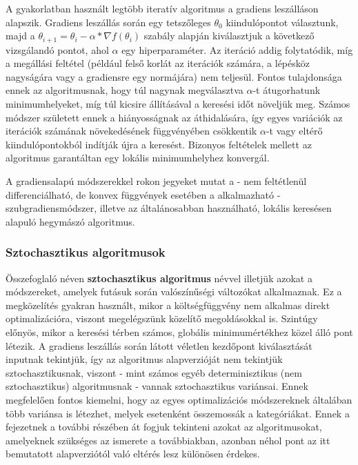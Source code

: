 A gyakorlatban használt legtöbb iteratív algoritmus a gradiens leszálláson alapszik. Gradiens leszállás során egy tetszőleges $\theta_0$ kiindulópontot választunk, majd a $\theta_{i+1} = \theta_i - \alpha * \nabla f(\theta_i)$ szabály alapján kiválasztjuk a következő vizsgálandó pontot, ahol $\alpha$ egy hiperparaméter. Az iteráció addig folytatódik, míg a megállási feltétel (például felső korlát az iterációk számára, a lépésköz nagyságára vagy a gradiensre egy normájára) nem teljesül. Fontos tulajdonsága ennek az algoritmusnak, hogy túl nagynak megválasztva $\alpha$-t átugorhatunk minimumhelyeket, míg túl kicsire állításával a keresési időt növeljük meg. Számos módszer született ennek a hiányosságnak az áthidalására, így egyes variációk az iterációk számának növekedésének függvényében csökkentik $\alpha$-t vagy eltérő kiindulópontokból indítják újra a keresést. Bizonyos feltételek mellett az algoritmus garantáltan egy lokális minimumhelyhez konvergál\cite{gradient_convergence}.


A gradiensalapú módszerekkel rokon jegyeket mutat a - nem feltétlenül differenciálható, de konvex függvények esetében a alkalmazható - szubgradiensmódszer, illetve az általánosabban használható, lokális keresésen alapuló hegymászó algoritmus.

\subsubsection{Sztochasztikus algoritmusok}

Összefoglaló néven \textbf{sztochasztikus algoritmus} névvel illetjük azokat a módszereket, amelyek futásuk során valószínűségi változókat alkalmaznak. Ez a megközelítés gyakran használt, mikor a költségfüggvény nem alkalmas direkt optimalizációra, viszont megelégszünk közelítő megoldásokkal is. Szintúgy előnyös, mikor a keresési térben számos, globális minimumértékhez közel álló pont létezik. A gradiens leszállás során látott véletlen kezdőpont kiválasztását inputnak tekintjük, így az algoritmus alapverzióját nem tekintjük sztochasztikusnak, viszont - mint számos egyéb determinisztikus (nem sztochasztikus) algoritmusnak - vannak sztochasztikus variánsai. Ennek megfelelően fontos kiemelni, hogy az egyes optimalizációs módszereknek általában több variánsa is létezhet, melyek esetenként összemossák a kategóriákat. Ennek a fejezetnek a további részében át fogjuk tekinteni azokat az algoritmusokat, amelyeknek szükséges az ismerete a továbbiakban, azonban néhol pont az itt bemutatott alapverziótól való eltérés lesz különösen érdekes.


